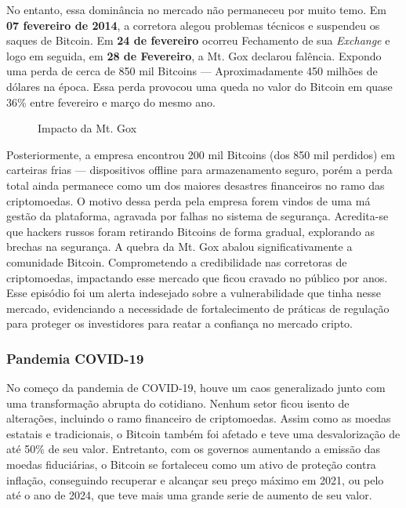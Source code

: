 No entanto, essa dominância no mercado não permaneceu por muito temo. Em \textbf{07 fevereiro de 2014}, a corretora alegou problemas técnicos e suspendeu os saques de Bitcoin. Em \textbf{24 de fevereiro} ocorreu Fechamento de sua \textit{Exchange} e logo em seguida, em \textbf{28 de Fevereiro}, a Mt. Gox declarou falência. Expondo uma perda de cerca de 850 mil Bitcoins — Aproximadamente 450 milhões de dólares na época. Essa perda provocou uma queda no valor do Bitcoin em quase 36\% entre fevereiro e março do mesmo ano. 

\begin{figure}
    \centering
    \caption{Impacto da Mt. Gox}
    \label{fig:Mt. Gox Gráfico}
\end{figure}

Posteriormente, a empresa encontrou 200 mil Bitcoins (dos 850 mil perdidos) em carteiras frias — dispositivos offline para armazenamento seguro, porém a perda total ainda permanece como um dos maiores desastres financeiros no ramo das criptomoedas. O motivo dessa perda pela empresa forem vindos de uma má gestão da plataforma, agravada por falhas no sistema de segurança. Acredita-se que hackers russos foram retirando Bitcoins de forma gradual, explorando as brechas na segurança. 
 \newpage
A quebra da Mt. Gox abalou  significativamente a comunidade Bitcoin. Comprometendo a credibilidade nas corretoras de criptomoedas, impactando esse mercado que ficou cravado no público por anos. Esse episódio foi um alerta indesejado sobre a vulnerabilidade que tinha nesse mercado,  evidenciando a necessidade de fortalecimento de práticas de regulação para proteger os investidores para reatar a confiança no mercado cripto.

\subsubsection{\textbf{Pandemia COVID-19}}

No começo da pandemia de COVID-19, houve um caos generalizado junto com uma transformação abrupta do cotidiano. Nenhum setor ficou isento de alterações, incluindo o ramo financeiro de criptomoedas. Assim como as moedas estatais e tradicionais, o Bitcoin também foi afetado e teve uma desvalorização de até 50\% de seu valor. Entretanto, com os governos aumentando a emissão das moedas fiduciárias, o Bitcoin se fortaleceu como um ativo de proteção contra inflação, conseguindo recuperar e alcançar seu preço máximo em 2021, ou pelo até o ano de 2024, que teve mais uma grande serie de aumento de seu valor.

